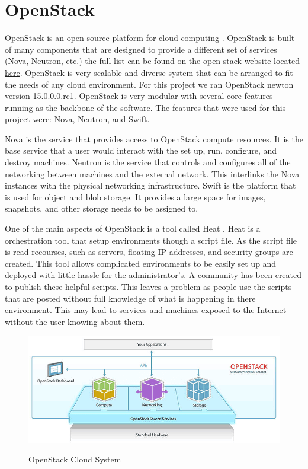 \documentclass[12pt]{article}
\begin{document}
\section{OpenStack}
OpenStack is an open source platform for cloud computing \cite{wiki:OpenStack}. OpenStack is built of many components that are designed to provide a different set of services (Nova, Neutron, etc.) the full list can be found on the open stack website located \href{https://www.openstack.org/software/project-navigator/}{here}. OpenStack is very scalable and diverse system that can be arranged to fit the needs of any cloud environment. For this project we ran OpenStack newton version 15.0.0.0.rc1. OpenStack is very modular with several core features running as the backbone of the software. The features that were used for this project were: Nova, Neutron, and Swift.

Nova is the service that provides access to OpenStack compute resources. It is the base service that a user would interact with the set up, run, configure, and destroy machines. Neutron is the service that controls and configures all of the networking between machines and the external network. This interlinks the Nova instances with the physical networking infrastructure.  Swift is the platform that is used for object and blob storage. It provides a large space for images, snapshots, and other storage needs to be assigned to. 

One of the main aspects of OpenStack is a tool called Heat \cite{HeatOS}. Heat is a orchestration tool that setup environments though a script file. As the script file is read recourses, such as servers, floating IP addresses, and security groups are created. This tool allows complicated environments to be easily set up and deployed with little hassle for the administrator's. A community has been created to publish these helpful scripts. This leaves a problem as people use the scripts that are posted without full knowledge of what is happening in there environment. This may lead to services and machines exposed to the Internet without the user knowing about them. 
\begin{figure}[H]
    \centering
    \includegraphics[scale=.6]{./pic/openstack-sm.png}
    \label{fig:Hypervisors}
    \caption{OpenStack Cloud System}
\end{figure}
\end{document}
